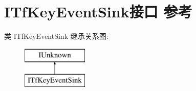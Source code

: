 \hypertarget{interface_i_tf_key_event_sink}{}\section{I\+Tf\+Key\+Event\+Sink接口 参考}
\label{interface_i_tf_key_event_sink}
类 I\+Tf\+Key\+Event\+Sink 继承关系图\+:\begin{figure}[H]
\begin{center}
\leavevmode
\includegraphics[height=2.000000cm]{interface_i_tf_key_event_sink}
\end{center}
\end{figure}
